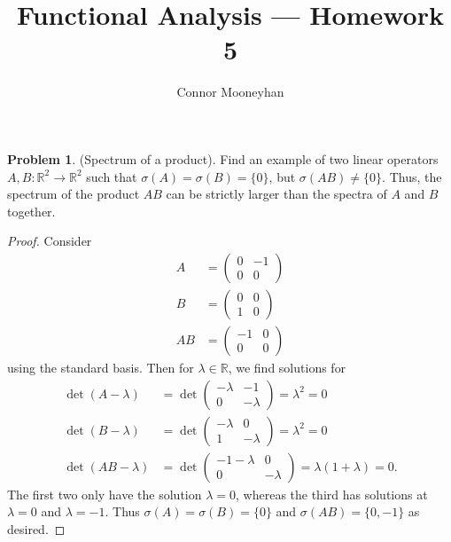 \documentclass[12pt]{article}
\title{Functional Analysis --- Homework 5}
\author{Connor Mooneyhan}
\date{}
\theoremstyle{definition}
\newtheorem{ex}{Problem}
\begin{document}
\maketitle

\begin{ex}
	(Spectrum of a product).
	Find an example of two linear operators $A, B : \mathbb{R}^2 \to \mathbb{R}^2$ such that $\sigma(A) = \sigma(B) = \lbrace 0 \rbrace$, but $\sigma(AB) \neq \lbrace 0 \rbrace$.
	Thus, the spectrum of the product $AB$ can be strictly larger than the spectra of $A$ and $B$ together.
\end{ex}
\begin{proof}
	Consider \begin{align*}
		A  & = \begin{pmatrix}0 & -1 \\ 0 & 0\end{pmatrix}  \\
		B  & = \begin{pmatrix}0 & 0 \\ 1 & 0\end{pmatrix}   \\
		AB & = \begin{pmatrix}-1 & 0 \\ 0 & 0 \end{pmatrix}
	\end{align*}
	using the standard basis.
	Then for $\lambda \in \mathbb{R}$, we find solutions for \begin{align*}
		\det(A - \lambda)  & = \det\begin{pmatrix}-\lambda & -1 \\ 0 & -\lambda\end{pmatrix} = \lambda^2 = 0              \\
		\det(B - \lambda)  & = \det\begin{pmatrix}-\lambda & 0 \\ 1 & -\lambda\end{pmatrix} = \lambda^2 = 0               \\
		\det(AB - \lambda) & = \det\begin{pmatrix}-1-\lambda & 0 \\ 0 & -\lambda\end{pmatrix} = \lambda(1 + \lambda) = 0.
	\end{align*}
	The first two only have the solution $\lambda = 0$, whereas the third has solutions at $\lambda = 0$ and $\lambda = -1$.
	Thus $\sigma(A) = \sigma(B) = \lbrace 0 \rbrace$ and $\sigma(AB) = \lbrace 0, -1 \rbrace$ as desired.
\end{proof}
\end{document}
